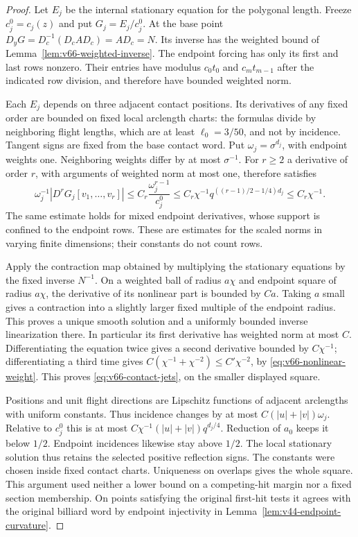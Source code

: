 \begin{proof}
Let $E_j$ be the internal stationary equation for the polygonal length.
Freeze $c_j^0=c_j(z)$ and put $G_j=E_j/c_j^0$. At the base point
$D_yG=D_c^{-1}(D_cAD_c)=A D_c=N$. Its inverse has the weighted
bound of Lemma~\ref{lem:v66-weighted-inverse}. The endpoint forcing
has only its first and last rows nonzero. Their entries have modulus
$c_0t_0$ and $c_mt_{m-1}$ after the indicated row division, and
therefore have bounded weighted norm.

Each $E_j$ depends on three adjacent contact positions. Its derivatives
of any fixed order are bounded on fixed local arclength charts: the
formulas divide by neighboring flight lengths, which are at least
$\ell_0=3/50$, and not by incidence. Tangent signs are fixed from the
base contact word. Put $\omega_j=\sigma^{d_j}$, with endpoint weights
one. Neighboring weights differ by at most $\sigma^{-1}$. For $r\ge2$
a derivative of order $r$, with arguments of weighted norm at most one,
therefore satisfies
\begin{equation}\label{eq:v66-nonlinear-weight}
 \omega_j^{-1}|D^rG_j[v_1,\ldots,v_r]|
 \le C_r\frac{\omega_j^{r-1}}{c_j^0}
 \le C_r\chi^{-1}q^{((r-1)/2-1/4)d_j}
 \le C_r\chi^{-1}.
\end{equation}
The same estimate holds for mixed endpoint derivatives, whose support
is confined to the endpoint rows. These are estimates for the scaled
norms in varying finite dimensions; their constants do not count rows.

Apply the contraction map obtained by multiplying the stationary
equations by the fixed inverse $N^{-1}$. On a weighted ball of radius
$a\chi$ and endpoint square of radius $a\chi$, the derivative of its
nonlinear part is bounded by $C a$. Taking $a$ small gives a contraction
into a slightly larger fixed multiple of the endpoint radius. This
proves a unique smooth solution and a uniformly bounded inverse
linearization there. In particular its first derivative has weighted
norm at most $C$. Differentiating the equation twice gives a second
derivative bounded by $C\chi^{-1}$; differentiating a third time
gives $C(\chi^{-1}+\chi^{-2})\le C'\chi^{-2}$, by
\eqref{eq:v66-nonlinear-weight}. This proves
\eqref{eq:v66-contact-jets}, on the smaller displayed square.

Positions and unit flight directions are Lipschitz functions of
adjacent arclengths with uniform constants. Thus incidence changes by
at most $C(|u|+|v|)\omega_j$. Relative to $c_j^0$ this is at most
$C\chi^{-1}(|u|+|v|)q^{d_j/4}$. Reduction of $a_0$ keeps it below
$1/2$. Endpoint incidences likewise stay above $1/2$. The local
stationary solution thus retains the selected positive reflection
signs. The constants were chosen inside fixed contact charts.
Uniqueness on overlaps gives the whole square. This argument used
neither a lower bound on a competing-hit margin nor a fixed section
membership. On points satisfying the original first-hit tests it
agrees with the original billiard word by endpoint injectivity in
Lemma~\ref{lem:v44-endpoint-curvature}.
\end{proof}


